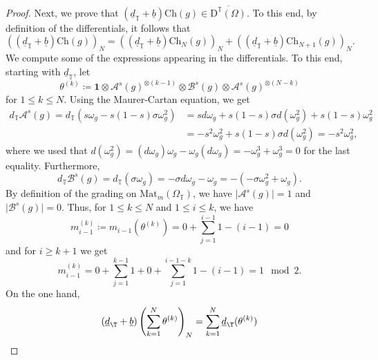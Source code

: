 \documentclass[a4paper, english, 12pt, bibliography=totocnumbered,
index=totoc]{scrartcl}
\begin{document}
\begin{proof}
	Next, we prove that $(\underline{d}_{\mathbb{T}} +
	\underline{b})\mathrm{Ch}(g) \in
	\overline{\mathrm{D}^{\mathbb{T}}(\Omega)}$.
	To this end, by definition of the differentials, it follows that
	\begin{equation*}
		((\underline{d}_{\mathbb{T}} +
		\underline{b})\mathrm{Ch}(g))_N=((\underline{d}_{\mathbb{T}} +
		\underline{b})
		\mathrm{Ch}_N(g))_N+((\underline{d}_{\mathbb{T}} + \underline{b})
		\mathrm{Ch}_{N+1}(g))_N.
	\end{equation*}
	We compute some of the expressions appearing in the
	differentials.
	To this end, starting with $\underline{d}_{\mathbb{T}}$, let
	\begin{equation*}
		\theta^{(k)} \coloneqq \mathbf{1} \otimes {\mathcal
			A}^{s}(g)^{\otimes (k-1)} \otimes {\mathcal B}^s(g) \otimes
		{\mathcal A}^{s}(g)^{\otimes (N-k)}
	\end{equation*}
	for $1 \leq k \leq N$.
	Using the Maurer-Cartan equation, we get
	\begin{align*}
		d_{\mathbb{T}} \mathcal{A}^s(g) =
		d_{\mathbb{T}}(s\omega_g - s(1-s)\sigma \omega_g^2) & = s
		d\omega_g + s(1-s)\sigma d(\omega_g^2) + s(1-s)\omega_g^2 \\
		& = -s^2\omega_g^2
		+ s(1-s)\sigma d(\omega_g^2) = -s^2 \omega_g^2,
	\end{align*}
	where we used that $d(\omega_g^2) = (d \omega_g)\omega_g - \omega_g (d
	\omega_g) = -\omega_g^3 + \omega_g^3 = 0$ for the last equality.
	Furthermore,
	\begin{equation*}
		d_{\mathbb{T}} \mathcal{B}^s(g) =
		d_{\mathbb{T}}(\sigma \omega_g) = -\sigma d\omega_g
		-\omega_g = -(-\sigma \omega_g^2 + \omega_g).
	\end{equation*}
	By definition of the grading on $\mathrm{Mat}_m(\Omega_{\mathbb{T}})$, we
	have $\lvert \mathcal{A}^s(g) \rvert = 1$
	and $\lvert \mathcal{B}^s(g) \rvert = 0$.
	Thus, for $1 \leq k \leq N$ and $1 \leq i \leq k$, we have
	\begin{equation*}
		m_{i-1}^{(k)} \coloneqq m_{i-1}(\theta^{(k)}) = 0 +
		\sum_{j=1}^{i-1} 1 - (i-1) = 0
	\end{equation*}
	and for $i \geq k+1$ we get
	\begin{equation*}
		m_{i-1}^{(k)} = 0 + \sum_{j=1}^{k-1} 1 + 0 +
		\sum_{j=1}^{i-1-k} 1 - (i-1) = 1 \mod 2.
	\end{equation*}
	On the one hand,
	\begin{align*}
		(\underline{d}_\T + \underline{b})\left(\sum_{k=1}^N
		\theta^{(k)}\right)_N
		& =
		\sum_{k=1}^N \underline{d}_\T(\theta^{(k)}) \\

\end{align*}
\end{proof}
\end{document}
